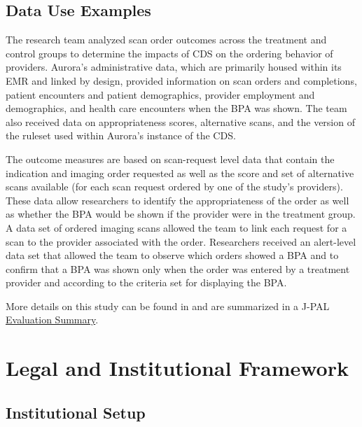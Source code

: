 \hypertarget{data-use-examples-3}{%
\subsection{Data Use Examples}\label{data-use-examples-3}}

The research team analyzed scan order outcomes across the treatment and control groups to determine the impacts of CDS on the ordering behavior of providers. Aurora's administrative data, which are primarily housed within its EMR and linked by design, provided information on scan orders and completions, patient encounters and patient demographics, provider employment and demographics, and health care encounters when the BPA was shown. The team also received data on appropriateness scores, alternative scans, and the version of the ruleset used within Aurora's instance of the CDS.

The outcome measures are based on scan-request level data that contain the indication and imaging order requested as well as the score and set of alternative scans available (for each scan request ordered by one of the study's providers). These data allow researchers to identify the appropriateness of the order as well as whether the BPA would be shown if the provider were in the treatment group. A data set of ordered imaging scans allowed the team to link each request for a scan to the provider associated with the order. Researchers received an alert-level data set that allowed the team to observe which orders showed a BPA and to confirm that a BPA was shown only when the order was entered by a treatment provider and according to the criteria set for displaying the BPA.

More details on this study can be found in \citep{doyle2019} and are summarized in a J-PAL \href{https://www.povertyactionlab.org/evaluation/clinical-decision-support-radiology-imaging-united-states}{Evaluation Summary}.

\hypertarget{legal-and-institutional-framework-3}{%
\section{Legal and Institutional Framework}\label{legal-and-institutional-framework-3}}

\hypertarget{institutional-setup-3}{%
\subsection{Institutional Setup}\label{institutional-setup-3}}

